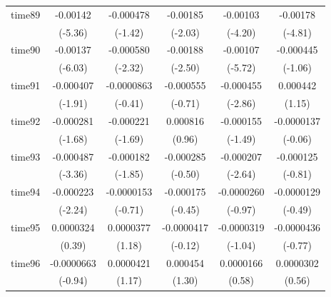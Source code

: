 \begin{table}[htbp]
\begin{tabular}{l*{5}{c}}
time89      &    -0.00142\sym{***}&   -0.000478         &    -0.00185\sym{*}  &    -0.00103\sym{***}&    -0.00178\sym{***}\\
            &     (-5.36)         &     (-1.42)         &     (-2.03)         &     (-4.20)         &     (-4.81)         \\
time90      &    -0.00137\sym{***}&   -0.000580\sym{*}  &    -0.00188\sym{*}  &    -0.00107\sym{***}&   -0.000445         \\
            &     (-6.03)         &     (-2.32)         &     (-2.50)         &     (-5.72)         &     (-1.06)         \\
time91      &   -0.000407         &  -0.0000863         &   -0.000555         &   -0.000455\sym{**} &    0.000442         \\
            &     (-1.91)         &     (-0.41)         &     (-0.71)         &     (-2.86)         &      (1.15)         \\
time92      &   -0.000281         &   -0.000221         &    0.000816         &   -0.000155         &  -0.0000137         \\
            &     (-1.68)         &     (-1.69)         &      (0.96)         &     (-1.49)         &     (-0.06)         \\
time93      &   -0.000487\sym{***}&   -0.000182         &   -0.000285         &   -0.000207\sym{**} &   -0.000125         \\
            &     (-3.36)         &     (-1.85)         &     (-0.50)         &     (-2.64)         &     (-0.81)         \\
time94      &   -0.000223\sym{*}  &  -0.0000153         &   -0.000175         &  -0.0000260         &  -0.0000129         \\
            &     (-2.24)         &     (-0.71)         &     (-0.45)         &     (-0.97)         &     (-0.49)         \\
time95      &   0.0000324         &   0.0000377         &  -0.0000417         &  -0.0000319         &  -0.0000436         \\
            &      (0.39)         &      (1.18)         &     (-0.12)         &     (-1.04)         &     (-0.77)         \\
time96      &  -0.0000663         &   0.0000421         &    0.000454         &   0.0000166         &   0.0000302         \\
            &     (-0.94)         &      (1.17)         &      (1.30)         &      (0.58)         &      (0.56)         \\

\end{tabular}
\end{table}
